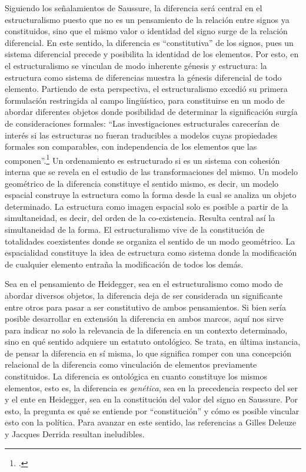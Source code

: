 Siguiendo los señalamientos de Saussure, la diferencia será central en
el estructuralismo puesto que no es un pensamiento de la relación entre
signos ya constituidos, sino que el mismo valor o identidad del signo
surge de la relación diferencial. En este sentido, la diferencia es
\enquote{constitutiva} de los signos, pues un sistema diferencial precede y
posibilita la identidad de los elementos. Por esto, en el
estructuralismo se vinculan de modo inherente génesis y estructura: la
estructura como sistema de diferencias muestra la génesis diferencial de
todo elemento. Partiendo de esta perspectiva, el estructuralismo excedió
su primera formulación restringida al campo lingüístico, para
constituirse en un modo de abordar diferentes objetos donde posibilidad
de determinar la significación surgía de consideraciones formales: \enquote{Las
investigaciones estructurales carecerían de interés si las estructuras
no fueran traducibles a modelos cuyas propiedades formales son
comparables, con independencia de los elementos que las
componen}.\footcite[256]{levistrauss1977} Un ordenamiento es
estructurado si es un sistema con cohesión interna que se revela en el
estudio de las transformaciones del mismo. Un modelo geométrico de la
diferencia constituye el sentido mismo, es decir, un modelo espacial
construye la estructura como la forma desde la cual se analiza un objeto
determinado. La estructura como imagen espacial solo es posible a partir
de la simultaneidad, es decir, del orden de la co-existencia. Resulta
central así la simultaneidad de la forma. El estructuralismo vive de la
constitución de totalidades coexistentes donde se organiza el sentido de
un modo geométrico. La espacialidad constituye la idea de estructura
como sistema donde la modificación de cualquier elemento entraña la
modificación de todos los demás.

Sea en el pensamiento de Heidegger, sea en el estructuralismo como modo
de abordar diversos objetos, la diferencia deja de ser considerada un
significante entre otros para pasar a ser constitutivo de ambos
pensamientos. Si bien sería posible desarrollar en extensión la
diferencia en ambos marcos, aquí nos sirve para indicar no solo la
relevancia de la diferencia en un contexto determinado, sino en qué
sentido adquiere un estatuto ontológico. Se trata, en última instancia,
de pensar la diferencia en sí misma, lo que significa romper con una
concepción relacional de la diferencia como vinculación de elementos
previamente constituidos. La diferencia es ontológica en cuanto
constituye los mismos elementos, esto es, la diferencia es
\emph{genética}, sea en la precedencia respecto del ser y el ente en
Heidegger, sea en la constitución del valor del signo en Saussure. Por
esto, la pregunta es qué se entiende por \enquote{constitución} y cómo es
posible vincular esto con la política. Para avanzar en este sentido, las
referencias a Gilles Deleuze y Jacques Derrida resultan ineludibles.

